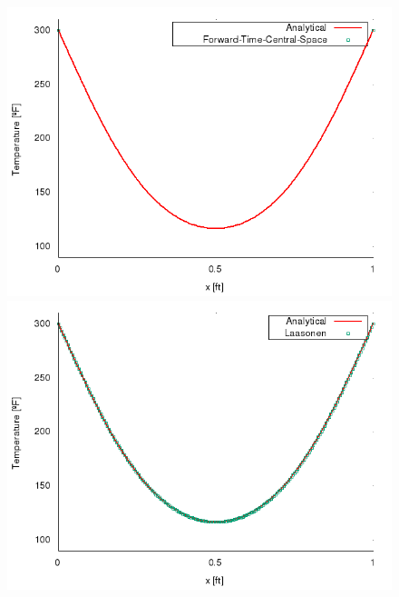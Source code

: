\documentclass[12pt]{article}
\begin{document}
\begin{figure}[!htb]
\centering
\begin{minipage}{.28\textwidth}
  \centering
  \includegraphics[width=1\linewidth]{ftcs.png}
\end{minipage}%
\begin{minipage}{.28\textwidth}
  \centering
  \includegraphics[width=1\linewidth]{laa.png}
\end{minipage} %
\begin{minipage}{.28\textwidth}
  \centering

\end{minipage}
\end{figure}
\end{document}
